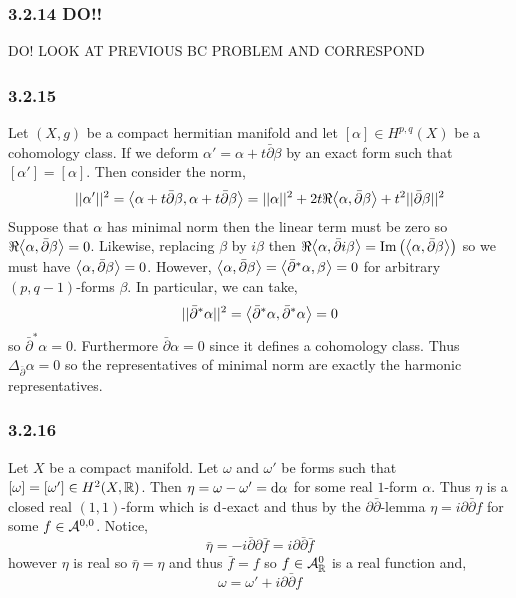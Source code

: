 \documentclass[12pt]{article}
\begin{document}
\subsubsection{3.2.14 DO!!}

DO! LOOK AT PREVIOUS BC PROBLEM AND CORRESPOND

\subsubsection{3.2.15}

Let $(X, g)$ be a compact hermitian manifold and let $[\alpha] \in H^{p,q}(X)$ be a cohomology class. If we deform $\alpha' = \alpha + t \bar{\partial} \beta$ by an exact form such that $[\alpha'] = [\alpha]$. Then consider the norm,
\[ || \alpha' ||^2 = \left< \alpha + t \bar{\partial} \beta, \alpha + t \bar{\partial}  \beta \right> = || \alpha ||^2 + 2 t \Re{\left< \alpha, \bar{\partial} \beta \right>} + t^2 || \bar{\partial} \beta ||^2 \]
Suppose that $\alpha$ has minimal norm then the linear term must be zero so $\Re{\left< \alpha, \bar{\partial} \beta \right>} = 0$. Likewise, replacing $\beta$ by $i \beta$ then $\Re{\left< \alpha, \bar{\partial} i \beta \right>} = \mathrm{Im}\left( \left< \alpha, \bar{\partial} \beta \right> \right)$ so we must have $\left< \alpha, \bar{\partial} \beta \right> = 0$. However, $\left< \alpha, \bar{\partial} \beta \right> = \left< \bar{\partial}^* \alpha, \beta \right> = 0$ for arbitrary $(p, q-1)$-forms $\beta$. In particular, we can take,
\[ || \bar{\partial}^* \alpha ||^2 = \left< \bar{\partial}^* \alpha, \bar{\partial}^* \alpha \right> = 0 \]
so $\bar{\partial}^* \alpha = 0$. Furthermore $\bar{\partial} \alpha = 0$ since it defines a cohomology class. Thus $\Delta_{\bar{\partial}} \alpha = 0$ so the representatives of minimal norm are exactly the harmonic representatives.

\subsubsection{3.2.16}

Let $X$ be a compact \kahler manifold. Let $\omega$ and $\omega'$ be \kahler forms such that $[\omega] = [\omega'] \in H^2(X, \mathbb{R})$. Then $\eta = \omega - \omega' = \mathrm{d}{\alpha}$ for some real $1$-form $\alpha$. Thus $\eta$ is a closed real $(1,1)$-form which is $\mathrm{d}$-exact and thus by the $\partial \bar{\partial}$-lemma $\eta = i \partial \bar{\partial} f$ for some $f \in \mathcal{A}^{0,0}$. Notice,
\[ \bar{\eta} = - i \bar{\partial} \partial \bar{f} = i \partial \bar{\partial} \bar{f} \]
however $\eta$ is real so $\bar{\eta} = \eta$ and thus $\bar{f} = f$ so $f \in \mathcal{A}^0_{\mathbb{R}}$ is a real function and,
\[ \omega = \omega' + i \partial \bar{\partial} f \]
\end{document}
